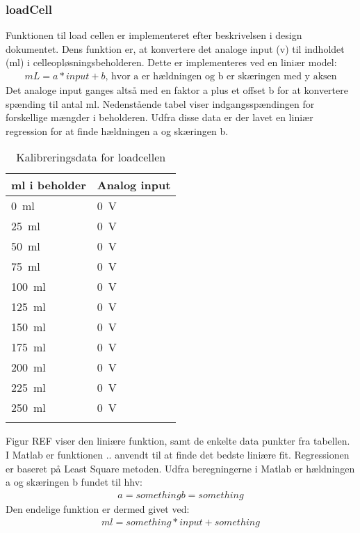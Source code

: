 \subsubsection{loadCell}
Funktionen til load cellen er implementeret efter beskrivelsen i design dokumentet. Dens funktion er, at konvertere det analoge input (v) til indholdet (ml) i celleopløsningsbeholderen. Dette er implementeres ved en liniær model:
\begin{align}
mL = a*input+b \text{, hvor a er hældningen og b er skæringen med y aksen}
\end{align}
Det analoge input ganges altså med en faktor a plus et offset b for at konvertere spænding til antal ml. Nedenstående tabel viser indgangsspændingen for forskellige mængder i beholderen. Udfra disse data er der lavet en liniær regression for at finde hældningen a og skæringen b.
\begin{center}
		\begin{longtable}{ | m{3cm} | m{3cm}| } 
			\hline
			\textbf{ml i beholder} &\textbf{Analog input} \\ 
			\hline
			 \SI{0}{\milli\litre} & \SI{0}{\volt} \\ 
			\hline
			 \SI{25}{\milli\litre} & \SI{0}{\volt} \\ 
			\hline
			\SI{50}{\milli\litre} & \SI{0}{\volt} \\ 
			\hline
			\SI{75}{\milli\litre} & \SI{0}{\volt} \\ 
			\hline
			\SI{100}{\milli\litre} & \SI{0}{\volt} \\ 
			\hline
			\SI{125}{\milli\litre} & \SI{0}{\volt} \\ 
			\hline
			\SI{150}{\milli\litre} & \SI{0}{\volt} \\ 
			\hline
			\SI{175}{\milli\litre} & \SI{0}{\volt} \\ 
			\hline
			\SI{200}{\milli\litre} & \SI{0}{\volt} \\ 
			\hline
			\SI{225}{\milli\litre} & \SI{0}{\volt} \\ 
			\hline
			\SI{250}{\milli\litre} & \SI{0}{\volt} \\ 
			\hline
			\caption{Kalibreringsdata for loadcellen}
			 		\end{longtable}
\end{center}

Figur REF viser den liniære funktion, samt de enkelte data punkter fra tabellen. I Matlab er funktionen .. anvendt til at finde det bedste liniære fit. Regressionen er baseret på Least Square metoden. 
Udfra beregningerne i Matlab er hældningen a og skæringen b fundet til hhv:
\begin{align}
a = something
b = something
\end{align}
Den endelige funktion er dermed givet ved:
\begin{align}
ml = something*input+something
\end{align}

